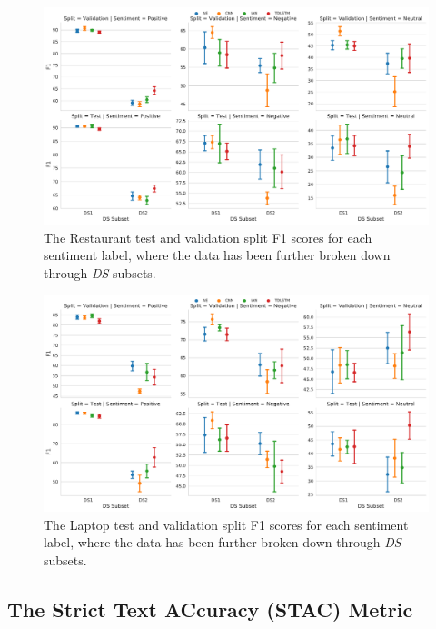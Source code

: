 \begin{figure}[h!]
    \centering
    \includegraphics[scale=0.4]{images/augmentation/methods_performance/baseline/sentiment_f1_ds_restaurant.pdf}
    \caption{The Restaurant test and validation split F1 scores for each sentiment label, where the data has been further broken down through \textit{DS} subsets.}
    \label{fig:aug_baseline_sentiment_f1_ds_restaurant}
\end{figure}
\begin{figure}[h!]
    \centering
    \includegraphics[scale=0.4]{images/augmentation/methods_performance/baseline/sentiment_f1_ds_laptop.pdf}
    \caption{The Laptop test and validation split F1 scores for each sentiment label, where the data has been further broken down through \textit{DS} subsets.}
    \label{fig:aug_baseline_sentiment_f1_ds_laptop}
\end{figure}

\FloatBarrier
\subsection{The Strict Text ACcuracy (STAC) Metric}
\label{section:augmentation_cwr_STAC_new}

